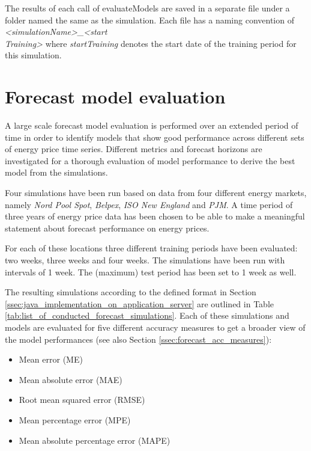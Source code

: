 The results of each call of evaluateModels are saved in a separate file under a folder named the same as the simulation. Each file has a naming convention of \textit{<simulationName>\_<start\\Training>} where \textit{startTraining} denotes the start date of the training period for this simulation. 



\section{Forecast model evaluation} \label{sec:forecast_model_evaluation}

A large scale forecast model evaluation is performed over an extended period of time in order to identify models that show good performance across different sets of energy price time series. Different metrics and forecast horizons are investigated for a thorough evaluation of model performance to derive the best model from the simulations. 

Four simulations have been run based on data from four different energy markets, namely \textit{Nord Pool Spot}, \textit{Belpex}, \textit{ISO New England} and \textit{PJM}. A time period of three years of energy price data has been chosen to be able to make a meaningful statement about forecast performance on energy prices. 

For each of these locations three different training periods have been evaluated: two weeks, three weeks and four weeks. The simulations have been run with intervals of 1 week. The (maximum) test period has been set to 1 week as well. 

The resulting simulations according to the defined format in Section \ref{ssec:java_implementation_on_application_server} are outlined in Table \ref{tab:list_of_conducted_forecast_simulations}. Each of these simulations and models are evaluated for five different accuracy measures to get a broader view of the model performances (see also Section \ref{ssec:forecast_acc_measures}): 

\begin{itemize}
	\item Mean error (ME)
	\item Mean absolute error (MAE)
	\item Root mean squared error (RMSE)
	\item Mean percentage error (MPE)
	\item Mean absolute percentage error (MAPE)
\end{itemize}

